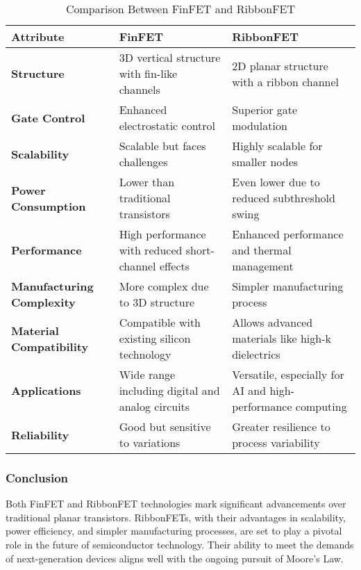 \documentclass[12pt]{report}
\begin{document}
\begin{titlepage}
\begin{table}[htbp]
    \centering
    \caption{Comparison Between FinFET and RibbonFET}
    \begin{tabularx}{\textwidth}{|X|X|X|}
        \hline
        \textbf{Attribute} & \textbf{FinFET} & \textbf{RibbonFET} \\
        \hline
        \textbf{Structure} & 3D vertical structure with fin-like channels & 2D planar structure with a ribbon channel \\
        \hline
        \textbf{Gate Control} & Enhanced electrostatic control & Superior gate modulation \\
        \hline
        \textbf{Scalability} & Scalable but faces challenges & Highly scalable for smaller nodes \\
        \hline
        \textbf{Power Consumption} & Lower than traditional transistors & Even lower due to reduced subthreshold swing \\
        \hline
        \textbf{Performance} & High performance with reduced short-channel effects & Enhanced performance and thermal management \\
        \hline
        \textbf{Manufacturing Complexity} & More complex due to 3D structure & Simpler manufacturing process \\
        \hline
        \textbf{Material Compatibility} & Compatible with existing silicon technology & Allows advanced materials like high-k dielectrics \\
        \hline
        \textbf{Applications} & Wide range including digital and analog circuits & Versatile, especially for AI and high-performance computing \\
        \hline
        \textbf{Reliability} & Good but sensitive to variations & Greater resilience to process variability \\
        \hline
    \end{tabularx}
\end{table}


\vspace{2in}

\subsubsection{Conclusion}
Both FinFET and RibbonFET technologies mark significant advancements over traditional planar transistors. RibbonFETs, with their advantages in scalability, power efficiency, and simpler manufacturing processes, are set to play a pivotal role in the future of semiconductor technology. Their ability to meet the demands of next-generation devices aligns well with the ongoing pursuit of Moore's Law.



\end{titlepage}
\end{document}
